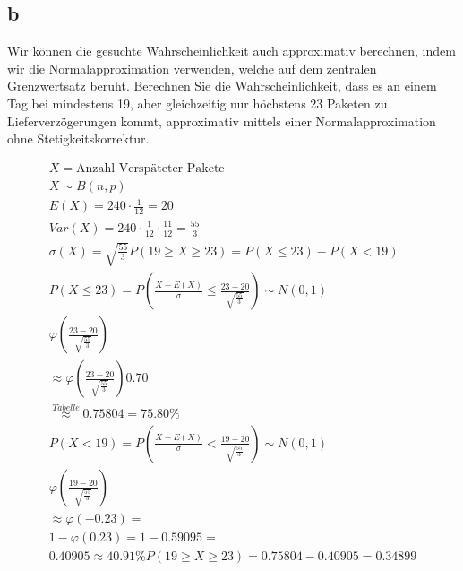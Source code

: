 \subsection{b}

Wir können die gesuchte Wahrscheinlichkeit auch approximativ berechnen, indem wir die Normalapproximation verwenden, welche auf dem zentralen Grenzwertsatz beruht. Berechnen Sie die Wahrscheinlichkeit, dass es an einem Tag bei mindestens 19, aber gleichzeitig nur höchstens 23 Paketen zu Lieferverzögerungen kommt, approximativ mittels einer Normalapproximation ohne Stetigkeitskorrektur. 

\begin{align*}
    X = \text{Anzahl Verspäteter Pakete} \\
    X \sim B(n, p) \\
    E(X) = 240 \cdot \frac{1}{12} = 20 \\
    Var(X) = 240 \cdot \frac{1}{12} \cdot \frac{11}{12} = \frac{55}{3} \\
    \sigma(X) = \sqrt{\frac{55}{3}}
    P(19 \geq X \geq 23) = P(X \leq 23) - P(X < 19) \\
    P(X \leq 23) = P\left(\frac{X - E(X)}{\sigma} \leq \frac{23 - 20}{\sqrt{\frac{55}{3}}}\right) \sim N(0, 1)\\
    \varphi\left(\frac{23 - 20}{\sqrt{\frac{55}{3}}}\right) \\
    \approx \varphi\left(\frac{23 - 20}{\sqrt{\frac{55}{3}}}\right)0.70 \\
    \overset{Tabelle}{\approx} 0.75804 = 75.80\% \\
    P(X < 19) = P\left(\frac{X - E(X)}{\sigma} < \frac{19 - 20}{\sqrt{\frac{55}{3}}}\right) \sim N(0, 1) \\
    \varphi \left(\frac{19 - 20}{\sqrt{\frac{55}{3}}}\right) \\
    \approx \varphi\left(-0.23\right) = \\
    1 - \varphi \left(0.23\right) = 1 - 0.59095 = \\
    0.40905 \approx 40.91\%
    P(19 \geq X \geq 23) = 0.75804 - 0.40905 = 0.34899
\end{align*}
